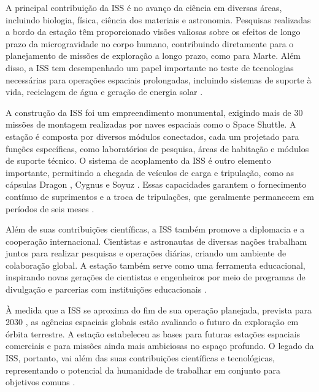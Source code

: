 A principal contribuição da ISS é no avanço da ciência em diversas áreas, incluindo biologia, física, ciência dos materiais e astronomia. Pesquisas realizadas a bordo da estação têm proporcionado visões valiosas sobre os efeitos de longo prazo da microgravidade no corpo humano, contribuindo diretamente para o planejamento de missões de exploração a longo prazo, como para Marte. Além disso, a ISS tem desempenhado um papel importante no teste de tecnologias necessárias para operações espaciais prolongadas, incluindo sistemas de suporte à vida, reciclagem de água e geração de energia solar \cite{nasaISS}.

A construção da ISS foi um empreendimento monumental, exigindo mais de 30 missões de montagem realizadas por naves espaciais como o Space Shuttle. A estação é composta por diversos módulos conectados, cada um projetado para funções específicas, como laboratórios de pesquisa, áreas de habitação e módulos de suporte técnico. O sistema de acoplamento da ISS é outro elemento importante, permitindo a chegada de veículos de carga e tripulação, como as cápsulas Dragon \cite{spacexDragon}, Cygnus \cite{northropCygnus} e Soyuz \cite{nasaSoyuz}. Essas capacidades garantem o fornecimento contínuo de suprimentos e a troca de tripulações, que geralmente permanecem em períodos de seis meses \cite{nasaISS}.

Além de suas contribuições científicas, a ISS também promove a diplomacia e a cooperação internacional. Cientistas e astronautas de diversas nações trabalham juntos para realizar pesquisas e operações diárias, criando um ambiente de colaboração global. A estação também serve como uma ferramenta educacional, inspirando novas gerações de cientistas e engenheiros por meio de programas de divulgação e parcerias com instituições educacionais \cite{nasaISS}.

À medida que a ISS se aproxima do fim de sua operação planejada, prevista para 2030 \cite{nasaISSPlan}, as agências espaciais globais estão avaliando o futuro da exploração em órbita terrestre. A estação estabeleceu as bases para futuras estações espaciais comerciais e para missões ainda mais ambiciosas no espaço profundo. O legado da ISS, portanto, vai além das suas contribuições científicas e tecnológicas, representando o potencial da humanidade de trabalhar em conjunto para objetivos comuns \cite{nasaISS}.



